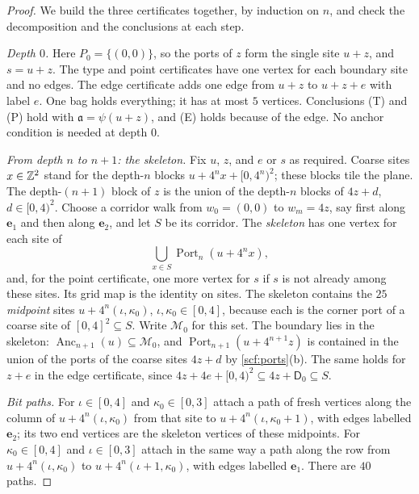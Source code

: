 \begin{proof}
We build the three certificates together, by induction on $n$, and check the decomposition and the conclusions at each step.

\emph{Depth $0$.} Here $P_0=\{(0,0)\}$, so the ports of $z$ form the single site $u+z$, and $s=u+z$. The type and point certificates have one vertex for each boundary site and no edges. The edge certificate adds one edge from $u+z$ to $u+z+e$ with label $e$. One bag holds everything; it has at most $5$ vertices. Conclusions (T) and (P) hold with $\mathfrak a=\psi(u+z)$, and (E) holds because of the edge. No anchor condition is needed at depth $0$.

\emph{From depth $n$ to $n+1$: the skeleton.} Fix $u$, $z$, and $e$ or $s$ as required. Coarse sites $x\in\mathbb{Z}^2$ stand for the depth-$n$ blocks $u+4^nx+[0,4^n)^2$; these blocks tile the plane. The depth-$(n+1)$ block of $z$ is the union of the depth-$n$ blocks of $4z+d$, $d\in[0,4)^2$. Choose a corridor walk from $w_0=(0,0)$ to $w_m=4z$, say first along $\mathbf e_1$ and then along $\mathbf e_2$, and let $S$ be its corridor. The \emph{skeleton} has one vertex for each site of
\[
\bigcup_{x\in S}\operatorname{Port}_n(u+4^nx),
\]
and, for the point certificate, one more vertex for $s$ if $s$ is not already among these sites. Its grid map is the identity on sites. The skeleton contains the $25$ \emph{midpoint} sites $u+4^n(\iota,\kappa_0)$, $\iota,\kappa_0\in[0,4]$, because each is the corner port of a coarse site of $[0,4]^2\subseteq S$. Write $\mathcal M_0$ for this set. The boundary lies in the skeleton: $\operatorname{Anc}_{n+1}(u)\subseteq\mathcal M_0$, and $\operatorname{Port}_{n+1}(u+4^{n+1}z)$ is contained in the union of the ports of the coarse sites $4z+d$ by \cref{scf:ports}(b). The same holds for $z+e$ in the edge certificate, since $4z+4e+[0,4)^2\subseteq 4z+\mathsf D_0\subseteq S$.

\emph{Bit paths.} For $\iota\in[0,4]$ and $\kappa_0\in[0,3]$ attach a path of fresh vertices along the column of $u+4^n(\iota,\kappa_0)$ from that site to $u+4^n(\iota,\kappa_0+1)$, with edges labelled $\mathbf e_2$; its two end vertices are the skeleton vertices of these midpoints. For $\kappa_0\in[0,4]$ and $\iota\in[0,3]$ attach in the same way a path along the row from $u+4^n(\iota,\kappa_0)$ to $u+4^n(\iota+1,\kappa_0)$, with edges labelled $\mathbf e_1$. There are $40$ paths.


\end{proof}
